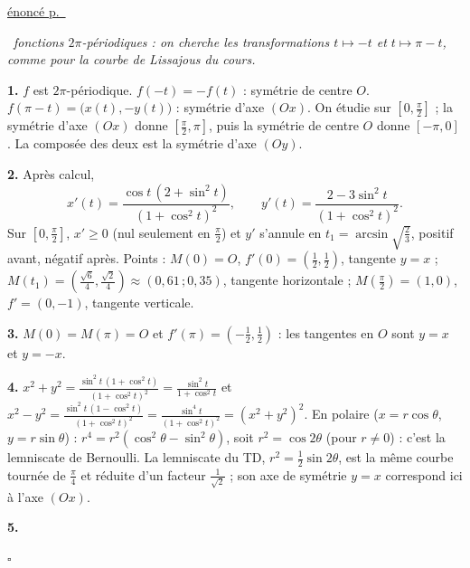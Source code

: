 \documentclass[a4paper,11pt]{article}
\numberwithin{equation}{section}
\numberwithin{figure}{section}
\numberwithin{table}{section}
\theoremstyle{enonce}
\theoremstyle{exemple}
\theoremstyle{remarque}
\newenvironment{corrige}[1]{%
  \par\needspace{6\baselineskip}\vspace{1em}\phantomsection\label{c:#1}%
  \noindent{\sffamily\bfseries\color{Bleu}Exercice~\ref{e:#1}}\quad
  {\scriptsize\sffamily\hyperref[e:#1]{\color{Gris}énoncé p.~\pageref{e:#1}}}\par\nobreak\vspace{0.2em}}%
  {\hfill\textcolor{BleuClair}{$\square$}\par}
\newcommand{\demarche}[1]{\noindent{\sffamily\bfseries\small\color{BleuMoyen}Démarche.}\ \textit{#1}\par\smallskip}
\begin{document}
\begin{corrige}{lemni}
\demarche{fonctions $2\pi$-périodiques : on cherche les transformations $t\mapsto-t$ et $t\mapsto\pi-t$, comme pour la courbe de Lissajous du cours.}
\textbf{1.} $f$ est $2\pi$-périodique. $f(-t)=-f(t)$ : symétrie de centre $O$. $f(\pi-t)=\big(x(t),-y(t)\big)$ : symétrie
d'axe $(Ox)$. On étudie sur $\left[0,\frac\pi2\right]$ ; la symétrie d'axe $(Ox)$ donne $\left[\frac\pi2,\pi\right]$, puis la
symétrie de centre $O$ donne $[-\pi,0]$. La composée des deux est la symétrie d'axe $(Oy)$.

\textbf{2.} Après calcul,
\[x'(t)=\frac{\cos t\,(2+\sin^2t)}{(1+\cos^2t)^2},\qquad y'(t)=\frac{2-3\sin^2t}{(1+\cos^2t)^2}.\]
Sur $\left[0,\frac\pi2\right]$, $x'\geq0$ (nul seulement en $\frac\pi2$) et $y'$ s'annule en $t_1=\arcsin\sqrt{\frac23}$,
positif avant, négatif après. Points : $M(0)=O$, $f'(0)=\left(\frac12,\frac12\right)$, tangente $y=x$ ;
$M(t_1)=\left(\frac{\sqrt6}4,\frac{\sqrt2}4\right)\approx(0{,}61\,;0{,}35)$, tangente horizontale ;
$M\left(\frac\pi2\right)=(1,0)$, $f'=(0,-1)$, tangente verticale.

\textbf{3.} $M(0)=M(\pi)=O$ et $f'(\pi)=\left(-\frac12,\frac12\right)$ : les tangentes en $O$ sont $y=x$ et $y=-x$.

\textbf{4.} $x^2+y^2=\frac{\sin^2t\,(1+\cos^2t)}{(1+\cos^2t)^2}=\frac{\sin^2t}{1+\cos^2t}$ et
$x^2-y^2=\frac{\sin^2t\,(1-\cos^2t)}{(1+\cos^2t)^2}=\frac{\sin^4t}{(1+\cos^2t)^2}=(x^2+y^2)^2$. En polaire
($x=r\cos\theta$, $y=r\sin\theta$) : $r^4=r^2(\cos^2\theta-\sin^2\theta)$, soit $r^2=\cos2\theta$ (pour $r\neq0$) : c'est la
lemniscate de Bernoulli. La lemniscate du TD, $r^2=\frac12\sin2\theta$, est la même courbe tournée de $\frac\pi4$ et
réduite d'un facteur $\frac1{\sqrt2}$ ; son axe de symétrie $y=x$ correspond ici à l'axe $(Ox)$.

\textbf{5.}
\begin{center}
\end{center}
\end{corrige}
\end{document}
